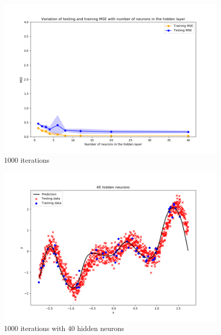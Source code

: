\begin{figure}[!htbp]
	\centering
        \includegraphics[width=14cm]{1_1_c_1_1000}
	\caption{1000 iterations}
\end{figure}

\begin{figure}[!htbp]
	\centering
        \includegraphics[width=14cm]{1_1_c_2_1000}
	\caption{1000 iterations  with 40 hidden neurons}
\end{figure}

\newpage

